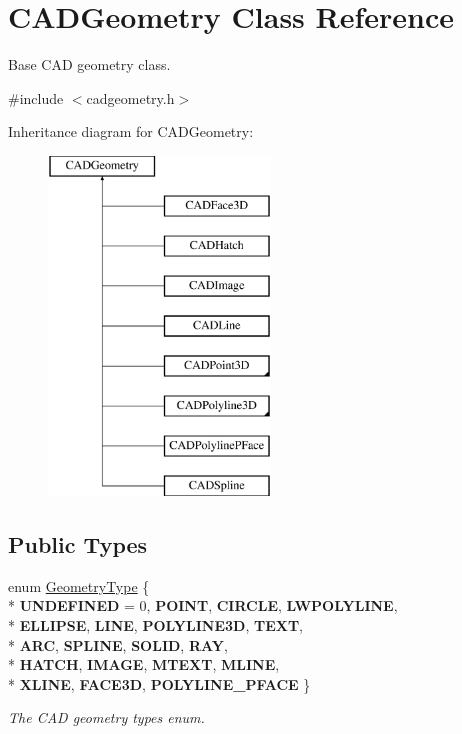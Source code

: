 \hypertarget{class_c_a_d_geometry}{}\section{C\+A\+D\+Geometry Class Reference}
\label{class_c_a_d_geometry}


Base C\+AD geometry class.  




{\ttfamily \#include $<$cadgeometry.\+h$>$}

Inheritance diagram for C\+A\+D\+Geometry\+:\begin{figure}[H]
\begin{center}
\leavevmode
\includegraphics[height=9.000000cm]{class_c_a_d_geometry}
\end{center}
\end{figure}
\subsection*{Public Types}
\begin{DoxyCompactItemize}
\item 
enum \hyperlink{class_c_a_d_geometry_a0515ed61d3514d528f78b8ba6c4fc5f3}{Geometry\+Type} \{ \\*
{\bfseries U\+N\+D\+E\+F\+I\+N\+ED} = 0, 
{\bfseries P\+O\+I\+NT}, 
{\bfseries C\+I\+R\+C\+LE}, 
{\bfseries L\+W\+P\+O\+L\+Y\+L\+I\+NE}, 
\\*
{\bfseries E\+L\+L\+I\+P\+SE}, 
{\bfseries L\+I\+NE}, 
{\bfseries P\+O\+L\+Y\+L\+I\+N\+E3D}, 
{\bfseries T\+E\+XT}, 
\\*
{\bfseries A\+RC}, 
{\bfseries S\+P\+L\+I\+NE}, 
{\bfseries S\+O\+L\+ID}, 
{\bfseries R\+AY}, 
\\*
{\bfseries H\+A\+T\+CH}, 
{\bfseries I\+M\+A\+GE}, 
{\bfseries M\+T\+E\+XT}, 
{\bfseries M\+L\+I\+NE}, 
\\*
{\bfseries X\+L\+I\+NE}, 
{\bfseries F\+A\+C\+E3D}, 
{\bfseries P\+O\+L\+Y\+L\+I\+N\+E\+\_\+\+P\+F\+A\+CE}
 \}\hypertarget{class_c_a_d_geometry_a0515ed61d3514d528f78b8ba6c4fc5f3}{}\label{class_c_a_d_geometry_a0515ed61d3514d528f78b8ba6c4fc5f3}
\begin{DoxyCompactList}\small\item\em The C\+AD geometry types enum. \end{DoxyCompactList}
\end{DoxyCompactItemize}
